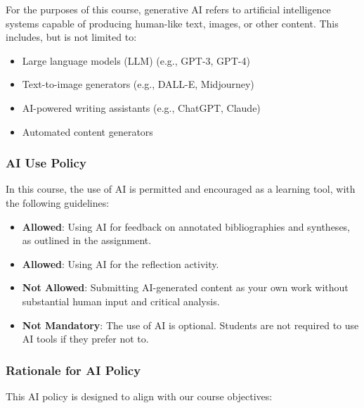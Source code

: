 \documentclass[12pt, letterpaper]{article}
\begin{document}
\noindent For the purposes of this course, generative AI refers to artificial intelligence systems capable of producing human-like text, images, or other content. This includes, but is not limited to:

\begin{itemize}
    \item Large language models (LLM) (e.g., GPT-3, GPT-4)
    \item Text-to-image generators (e.g., DALL-E, Midjourney)
    \item AI-powered writing assistants (e.g., ChatGPT, Claude)
    \item Automated content generators
\end{itemize}

\subsubsection*{AI Use Policy}

In this course, the use of AI is permitted and encouraged as a learning tool, with the following guidelines:

\begin{itemize}
    \item \textbf{Allowed}: Using AI for feedback on annotated bibliographies and syntheses, as outlined in the assignment.
    \item \textbf{Allowed}: Using AI for the reflection activity.
    \item \textbf{Not Allowed}: Submitting AI-generated content as your own work without substantial human input and critical analysis.
    \item \textbf{Not Mandatory}: The use of AI is optional. Students are not required to use AI tools if they prefer not to.
\end{itemize}

\subsubsection*{Rationale for AI Policy}

This AI policy is designed to align with our course objectives:
\end{document}
